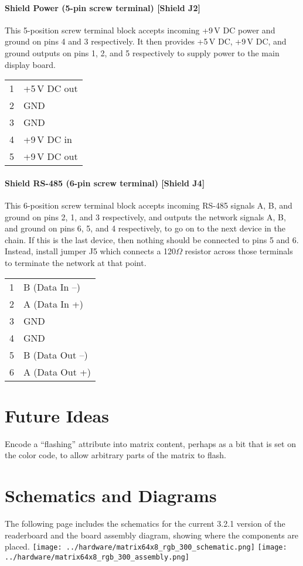\subsubsection{Shield Power (5-pin screw terminal) [Shield J2]}
This 5-position screw terminal block accepts incoming +9\,V DC power and ground on pins 4 and 3 respectively. It then provides
+5\,V DC, +9\,V DC, and ground outputs on pins 1, 2, and 5 respectively to supply power to the main display board.
\begin{center}
	\begin{tabular}{rl}
		1&+5\,V DC out\\
		2&GND\\
		3&GND\\
		4&+9\,V DC in\\
		5&+9\,V DC out\\
	\end{tabular}
\end{center}

\subsubsection{Shield RS-485 (6-pin screw terminal) [Shield J4]}
This 6-position screw terminal block accepts incoming RS-485 signals A, B, and ground on pins 2, 1, and 3 respectively, and outputs
the network signals A, B, and ground on pins 6, 5, and 4 respectively, to go on to the next device in the chain. If this is the last
device, then nothing should be connected to pins 5 and 6. Instead, install jumper J5 which connects a 120$\Omega$ resistor across
those terminals to terminate the network at that point.
\begin{center}
	\begin{tabular}{rl}
		1&B (Data In --)\\
		2&A (Data In +)\\
		3&GND\\
		4&GND\\
		5&B (Data Out --)\\
		6&A (Data Out +)\\
	\end{tabular}
\end{center}

\chapter{Future Ideas}
Encode a ``flashing'' attribute into matrix content, perhaps as a bit that
is set on the color code, to allow arbitrary parts of the matrix to flash.

\chapter{Schematics and Diagrams}
The following page includes the schematics for the current 3.2.1 version of the readerboard 
and the board assembly diagram, showing where the components are placed.
\newpage
\noindent\texttt{[image: ../hardware/matrix64x8\_rgb\_300\_schematic.png]}
\noindent\texttt{[image: ../hardware/matrix64x8\_rgb\_300\_assembly.png]}
\indexintoc

\printindex

